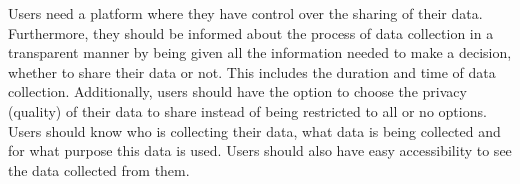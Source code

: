 Users need a platform where they have control over the sharing of their data. Furthermore, they should be informed about the process of data collection in a transparent manner by being given all the information needed to make a decision, whether to share their data or not. This includes the duration and time of data collection. Additionally, users should have the option to choose the privacy (quality) of their data to share instead of being restricted to all or no options. Users should know who is collecting their data, what data is being collected and for what purpose this data is used. Users should also have easy accessibility to see the data collected from them.


